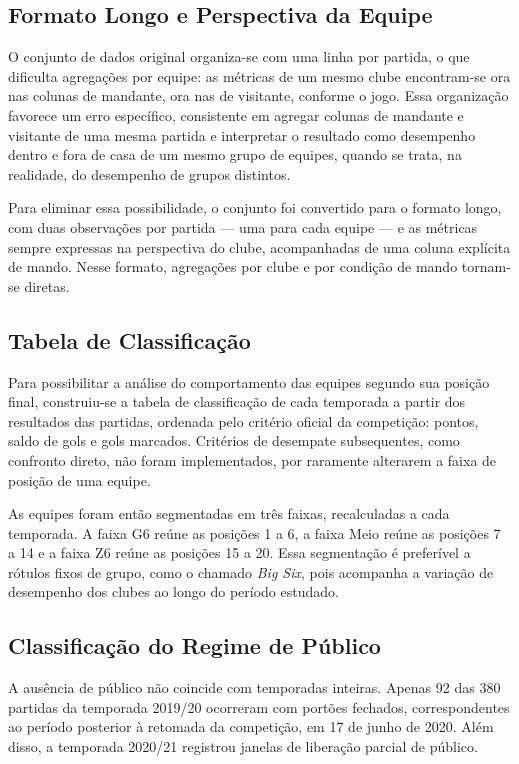 \subsection{Formato Longo e Perspectiva da Equipe}\label{sec:formato-longo}

O conjunto de dados original organiza-se com uma linha por partida, o que dificulta
agregações por equipe: as métricas de um mesmo clube encontram-se ora nas colunas
de mandante, ora nas de visitante, conforme o jogo. Essa organização favorece um
erro específico, consistente em agregar colunas de mandante e visitante de uma
mesma partida e interpretar o resultado como desempenho dentro e fora de casa de
um mesmo grupo de equipes, quando se trata, na realidade, do desempenho de
grupos distintos.

Para eliminar essa possibilidade, o conjunto foi convertido para o formato longo,
com duas observações por partida — uma para cada equipe — e as métricas sempre
expressas na perspectiva do clube, acompanhadas de uma coluna explícita de mando.
Nesse formato, agregações por clube e por condição de mando tornam-se diretas.

\subsection{Tabela de Classificação}\label{sec:classificacao}

Para possibilitar a análise do comportamento das equipes segundo sua posição
final, construiu-se a tabela de classificação de cada temporada a partir dos
resultados das partidas, ordenada pelo critério oficial da competição: pontos,
saldo de gols e gols marcados. Critérios de desempate subsequentes, como
confronto direto, não foram implementados, por raramente alterarem a faixa de
posição de uma equipe.

As equipes foram então segmentadas em três faixas, recalculadas a cada
temporada. A faixa G6 reúne as posições 1 a 6, a faixa Meio reúne as posições 7
a 14 e a faixa Z6 reúne as posições 15 a 20. Essa segmentação é preferível a rótulos fixos de grupo, como o
chamado \textit{Big Six}, pois acompanha a variação de desempenho dos clubes ao
longo do período estudado.

\subsection{Classificação do Regime de Público}\label{sec:regime-publico}

A ausência de público não coincide com temporadas inteiras. Apenas 92 das 380
partidas da temporada 2019/20 ocorreram com portões fechados, correspondentes ao
período posterior à retomada da competição, em 17 de junho de 2020. Além disso, a
temporada 2020/21 registrou janelas de liberação parcial de público.

